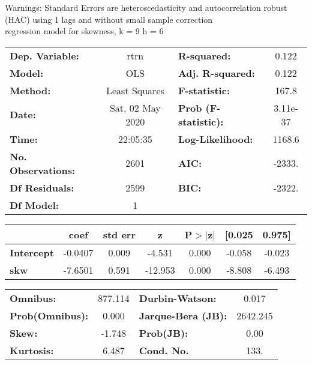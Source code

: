 Warnings: \newline
 [1] Standard Errors are heteroscedasticity and autocorrelation robust (HAC) using 1 lags and without small sample correction\\ 

regression model for skewness, k = 9 h = 6\begin{center}
\begin{tabular}{lclc}
\toprule
\textbf{Dep. Variable:}    &       rtrn       & \textbf{  R-squared:         } &     0.122   \\
\textbf{Model:}            &       OLS        & \textbf{  Adj. R-squared:    } &     0.122   \\
\textbf{Method:}           &  Least Squares   & \textbf{  F-statistic:       } &     167.8   \\
\textbf{Date:}             & Sat, 02 May 2020 & \textbf{  Prob (F-statistic):} &  3.11e-37   \\
\textbf{Time:}             &     22:05:35     & \textbf{  Log-Likelihood:    } &    1168.6   \\
\textbf{No. Observations:} &        2601      & \textbf{  AIC:               } &    -2333.   \\
\textbf{Df Residuals:}     &        2599      & \textbf{  BIC:               } &    -2322.   \\
\textbf{Df Model:}         &           1      & \textbf{                     } &             \\
\bottomrule
\end{tabular}
\begin{tabular}{lcccccc}
                   & \textbf{coef} & \textbf{std err} & \textbf{z} & \textbf{P$> |$z$|$} & \textbf{[0.025} & \textbf{0.975]}  \\
\midrule
\textbf{Intercept} &      -0.0407  &        0.009     &    -4.531  &         0.000        &       -0.058    &       -0.023     \\
\textbf{skw}       &      -7.6501  &        0.591     &   -12.953  &         0.000        &       -8.808    &       -6.493     \\
\bottomrule
\end{tabular}
\begin{tabular}{lclc}
\textbf{Omnibus:}       & 877.114 & \textbf{  Durbin-Watson:     } &    0.017  \\
\textbf{Prob(Omnibus):} &   0.000 & \textbf{  Jarque-Bera (JB):  } & 2642.245  \\
\textbf{Skew:}          &  -1.748 & \textbf{  Prob(JB):          } &     0.00  \\
\textbf{Kurtosis:}      &   6.487 & \textbf{  Cond. No.          } &     133.  \\
\bottomrule
\end{tabular}
\end{center}


